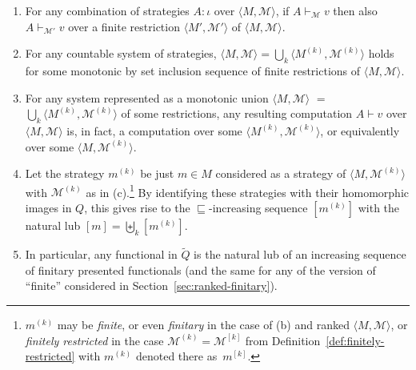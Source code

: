 \documentclass[fleqn]{LMCS}
\theoremstyle{plain}\newtheorem{satz}[thm]{Satz}
\theoremstyle{plain}\newtheorem{hyp}[thm]{Hypothesis}
\theoremstyle{plain}\newtheorem{hyps}[thm]{Hypotheses}
\theoremstyle{definition}\newtheorem{note}[thm]{Note}
\newcommand{\pointwiselub}{\biguplus}
\newcommand{\la}{\langle}
\newcommand{\ra}{\rangle}
\newcommand{\tuple}[1]{\la #1 \ra}
\newcommand{\MM}{{\mathcal M}}
\newcommand{\tQ}{\tilde{Q}}
\newcommand{\?}{\mbox{?}}
\begin{document}
\begin{lem}\label{lemma:computations-finitary}\hfill
\begin{enumerate}[\em(a)]
\item For any combination of strategies $A:\iota$ over 
$\tuple{M,\MM}$, 
if $A\vdash_\MM v$ then also $A\vdash_{\MM'} v$ over a 
finite restriction $\tuple{M',\MM'}$ of $\tuple{M,\MM}$. 

\item For any countable 
system of strategies, $\tuple{M,\MM}=\bigcup_k\tuple{M^{(k)},\MM^{(k)}}$ holds 
for some monotonic by set inclusion sequence of finite restrictions of $\tuple{M,\MM}$.

\item For any system represented as a monotonic union 
$\tuple{M,\MM}$ $=$ 
$\bigcup_k\tuple{M^{(k)},\MM^{(k)}}$ of some 
restrictions, 
any resulting computation $A\vdash v$ over $\tuple{M,\MM}$ is, in fact, 
a computation over some $\tuple{M^{(k)},\MM^{(k)}}$, or equivalently 
over some $\tuple{M,\MM^{(k)}}$. 

\item Let the strategy $m^{(k)}$ be just $m\in M$ considered as a strategy 
of $\tuple{M,\MM^{(k)}}$ with $\MM^{(k)}$ as in (c).\footnote{$m^{(k)}$ may be \emph{finite}, or even 
\emph{finitary} in the case of (b) and ranked $\tuple{M,\MM}$, 
or \emph{finitely restricted} in the case 
$\MM^{(k)}=\MM^{[k]}$ from 
Definition~\ref{def:finitely-restricted} 
with $m^{(k)}$ denoted there as~$m^{[k]}$.
} 
By identifying these strategies with their homomorphic images 
in $Q$, this gives rise to the $\sqsubseteq$-increasing sequence $[m^{(k)}]$ with the 
natural lub $[m]=\pointwiselub_k[m^{(k)}]$. 

\item In particular, any functional in $\tQ$ is the natural lub of an increasing sequence of 
finitary presented functionals (and the same for any of the version of ``finite'' considered in Section~\ref{sec:ranked-finitary}). 
\end{enumerate}
\end{lem}
\proof\hfill
\end{document}
